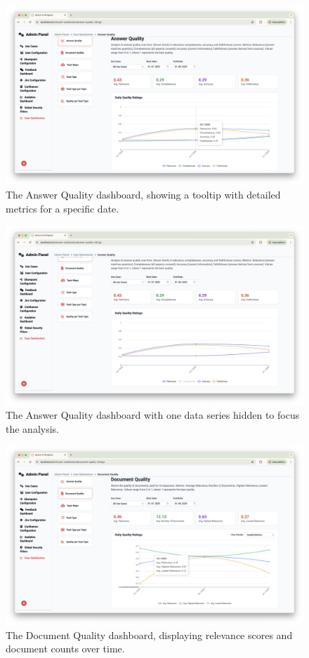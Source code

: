 \documentclass[
	english,
	ruledheaders=section,%
	class=report,%
	thesis={type=bachelor},%
	accentcolor=1b,%
	custommargins=true,%
	marginpar=false,%
	parskip=half-,%
	fontsize=11pt,%
	DIV=14,
]{tudapub}
\begin{document}
\begin{figure}[h!]
    \centering
    \includegraphics[width=0.75\linewidth]{images/AnswerQualityWithTooltip.png}
    \caption{The Answer Quality dashboard, showing a tooltip with detailed metrics for a specific date.}
    \label{fig:answer_quality_tooltip}
\end{figure}

\begin{figure}[h!]
    \centering
    \includegraphics[width=0.75\linewidth]{images/AnswerQualityWithoutOneLine.png}
    \caption{The Answer Quality dashboard with one data series hidden to focus the analysis.}
    \label{fig:answer_quality_filtered}
\end{figure}

\begin{figure}[h!]
    \centering
    \includegraphics[width=0.75\linewidth]{images/DocumentQuality.png}
    \caption{The Document Quality dashboard, displaying relevance scores and document counts over time.}
    \label{fig:document_quality}
\end{figure}
\end{document}
